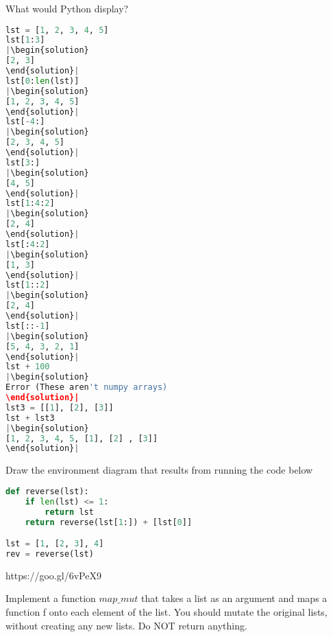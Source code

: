 \question
What would Python display?
\begin{lstlisting}[language=Python]
lst = [1, 2, 3, 4, 5]
lst[1:3] 
|\begin{solution}
[2, 3]
\end{solution}|
lst[0:len(lst)]
|\begin{solution}
[1, 2, 3, 4, 5]
\end{solution}|
lst[-4:]
|\begin{solution}
[2, 3, 4, 5] 
\end{solution}|
lst[3:]
|\begin{solution}
[4, 5]
\end{solution}|
lst[1:4:2]
|\begin{solution}
[2, 4] 
\end{solution}|
lst[:4:2]
|\begin{solution}
[1, 3]
\end{solution}|
lst[1::2]
|\begin{solution}
[2, 4] 
\end{solution}|
lst[::-1]
|\begin{solution}
[5, 4, 3, 2, 1]
\end{solution}|
lst + 100
|\begin{solution}
Error (These aren't numpy arrays)
\end{solution}|
lst3 = [[1], [2], [3]]
lst + lst3
|\begin{solution}
[1, 2, 3, 4, 5, [1], [2] , [3]]
\end{solution}|
\end{lstlisting}
\newpage
\question
Draw the environment diagram that results from running the code below

\begin{lstlisting}[language=Python]
def reverse(lst):
    if len(lst) <= 1:
        return lst
    return reverse(lst[1:]) + [lst[0]]

lst = [1, [2, 3], 4]
rev = reverse(lst)
\end{lstlisting}
\begin{solution}
https://goo.gl/6vPeX9
\end{solution}
 \hfill\break
\hfill\break
\hfill\break 
\hfill\break
\hfill\break
\hfill\break
\question
Implement a function $map\_mut$ that takes a list as an argument and maps a function f onto each element of the list. You should mutate the original lists, without creating any new lists. Do NOT return anything.

